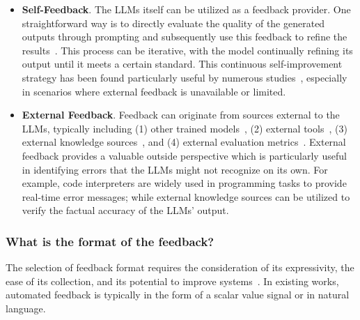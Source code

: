 \documentclass[12pt]{extarticle}
\begin{document}
\begin{itemize}
    \item \textbf{Self-Feedback}. The LLMs itself can be utilized as a feedback provider. One straightforward way is to directly evaluate the quality of the generated outputs through prompting and subsequently use this feedback to refine the results~\cite{madaan2023selfrefine, shinn2023reflexion}. This process can be iterative, with the model continually refining its output until it meets a certain standard. This continuous self-improvement strategy has been found particularly useful by numerous studies~\cite{selfee2023, yan-etal-2023-learning}, especially in scenarios where external feedback is unavailable or limited.

    \item \textbf{External Feedback}. Feedback can originate from sources external to the LLMs, typically including (1) other trained models~\cite{yan-etal-2023-learning, lightman2023lets}, (2) external tools~\cite{gou2023critic, charalambous2023new}, (3) external knowledge sources~\cite{gao2023rarr, yu2023improving}, and (4) external evaluation metrics~\cite{jung-etal-2022-maieutic, welleck2022generating}. External feedback provides a valuable outside perspective which is particularly useful in identifying errors that the LLMs might not recognize on its own. For example, code interpreters are widely used in programming tasks to provide real-time error messages; while external knowledge sources can be utilized to verify the factual accuracy of the LLMs' output.
\end{itemize}

\subsubsection{What is the format of the feedback?}
The selection of feedback format requires the consideration of its expressivity, the ease of its collection, and its potential to improve systems~\cite{fernandes2023bridging}. In existing works, automated feedback is typically in the form of a scalar value signal or in natural language.
\end{document}
